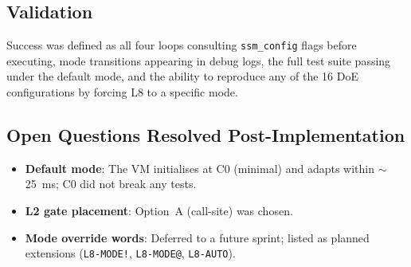 \subsection{Validation}

Success was defined as all four loops consulting \texttt{ssm\_config} flags
before executing, mode transitions appearing in debug logs, the full test
suite passing under the default mode, and the ability to reproduce any of the
16 DoE configurations by forcing L8 to a specific mode.

\subsection{Open Questions Resolved Post-Implementation}

\begin{itemize}
  \item \textbf{Default mode}: The VM initialises at C0 (minimal) and adapts
        within $\sim$25~ms; C0 did not break any tests.
  \item \textbf{L2 gate placement}: Option~A (call-site) was chosen.
  \item \textbf{Mode override words}: Deferred to a future sprint; listed as
        planned extensions (\texttt{L8-MODE!}, \texttt{L8-MODE@},
        \texttt{L8-AUTO}).
\end{itemize}

